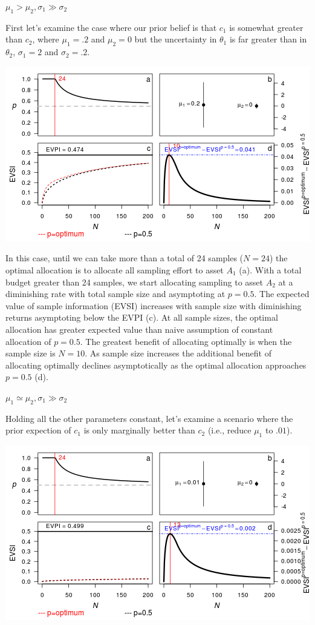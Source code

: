 \textbf{\(\mu_1 > \mu_2, \sigma_1 \gg \sigma_2\)}

First let's examine the case where our prior belief is that \(c_1\) is
somewhat greater than \(c_2\), where \(\mu_1=.2\) and \(\mu_2 = 0\) but
the uncertainty in \(\theta_1\) is far greater than in \(\theta_2\),
\(\sigma_1 = 2\) and \(\sigma_2 = .2\).

\includegraphics{figure/unnamed-chunk-2-1.png} \clearpage

In this case, until we can take more than a total of 24 samples
(\(N=24\)) the optimal allocation is to allocate all sampling effort to
asset \(A_1\) (a). With a total budget greater than 24 samples, we start
allocating sampling to asset \(A_2\) at a diminishing rate with total
sample size and asymptoting at \(p=0.5\). The expected value of sample
information (EVSI) increases with sample size with diminishing returns
asymptoting below the EVPI (c). At all sample sizes, the optimal
allocation has greater expected value than naive assumption of constant
allocation of \(p=0.5\). The greatest benefit of allocating optimally is
when the sample size is \(N=10\). As sample size increases the
additional benefit of allocating optimally declines asymptotically as
the optimal allocation approaches \(p=0.5\) (d).

\textbf{\(\mu_1 \simeq \mu_2, \sigma_1 \gg \sigma_2\)}

Holding all the other parameters constant, let's examine a scenario
where the prior expection of \(c_1\) is only marginally better than
\(c_2\) (i.e., reduce \(\mu_1\) to \(.01\)).

\includegraphics{figure/unnamed-chunk-3-1.png} \clearpage

